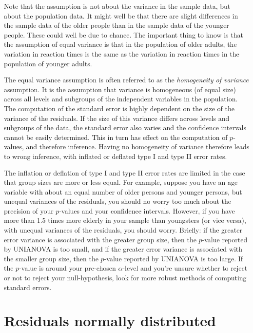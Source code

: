 \documentclass[]{book}\usepackage[]{graphicx}\usepackage[]{color}
\begin{document}
Note that the assumption is not about the variance in the sample data, but about the population data. It might well be that there are slight differences in the sample data of the older people than in the sample data of the younger people. These could well be due to chance. The important thing to know is that the assumption of equal variance is that in the population of older adults, the variation in reaction times is the same as the variation in reaction times in the population of younger adults. 

The equal variance assumption is often referred to as the \textit{homogeneity of variance} assumption. It is the assumption that variance is homogeneous (of equal size) across all levels and subgroups of the independent variables in the population. The computation of the standard error is highly dependent on the size of the variance of the residuals. If the size of this variance differs across levels and subgroups of the data, the standard error also varies and the confidence intervals cannot be easily determined. This in turn has effect on the computation of $p$-values, and therefore inference. Having no homogeneity of variance therefore leads to wrong inference, with inflated or deflated type I and type II error rates. 

The inflation or deflation of type I and type II error rates are limited in the case that group sizes are more or less equal. For example, suppose you have an age variable with about an equal number of older persons and younger persons, but unequal variances of the residuals, you should no worry too much about the precision of your $p$-values and your confidence intervals. However, if you have more than 1.5 times more elderly in your sample than youngsters (or vice versa), with unequal variances of the residuals, you should worry. Briefly: if the greater error variance is associated with the greater group size, then the $p$-value reported by UNIANOVA is too small, and if the greater error variance is associated with the smaller group size, then the $p$-value reported by UNIANOVA is too large. If the $p$-value is around your pre-chosen $\alpha$-level and you're unsure whether to reject or not to reject your null-hypothesis, look for more robust methods of computing standard errors.  


\section{Residuals normally distributed}
\end{document}
